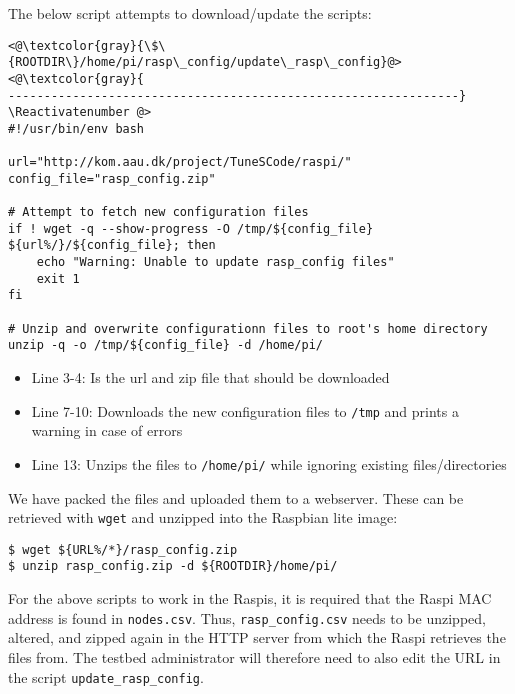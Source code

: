 The below script attempts to download/update the scripts:

\Suppressnumber\begin{lstlisting}[]
<@\textcolor{gray}{\$\{ROOTDIR\}/home/pi/rasp\_config/update\_rasp\_config}@>
<@\textcolor{gray}{
---------------------------------------------------------------}
\Reactivatenumber @>
#!/usr/bin/env bash

url="http://kom.aau.dk/project/TuneSCode/raspi/"
config_file="rasp_config.zip"

# Attempt to fetch new configuration files
if ! wget -q --show-progress -O /tmp/${config_file} ${url%/}/${config_file}; then
    echo "Warning: Unable to update rasp_config files"
    exit 1
fi

# Unzip and overwrite configurationn files to root's home directory
unzip -q -o /tmp/${config_file} -d /home/pi/
\end{lstlisting}
\FloatBarrier
\vspace{-5mm}

\begin{itemize}
    \item Line 3-4: Is the url and zip file that should be downloaded
    \item Line 7-10: Downloads the new configuration files to \texttt{/tmp}
        and prints a warning in case of errors
    \item Line 13: Unzips the files to \texttt{/home/pi/} while ignoring existing files/directories
\end{itemize}

We have packed the files and uploaded them to a webserver. These can be
retrieved with \texttt{wget} and unzipped into the Raspbian lite image:

\begin{lstlisting}[]
$ wget ${URL%/*}/rasp_config.zip
$ unzip rasp_config.zip -d ${ROOTDIR}/home/pi/
\end{lstlisting}
\FloatBarrier
\vspace{-5mm}

For the above scripts to work in the \ac{Raspi}s, it is required that the \ac{Raspi}
\ac{MAC} address is found in \texttt{nodes.csv}. Thus,
\texttt{rasp\_config.csv} needs to be unzipped, altered, and zipped again in
the \ac{HTTP} server from which the \ac{Raspi} retrieves the files from.
The testbed administrator will therefore need to also edit the \ac{URL} in the
script \texttt{update\_rasp\_config}.

